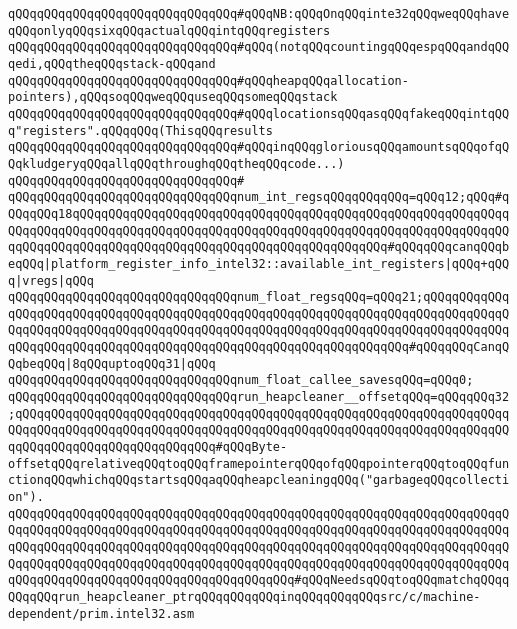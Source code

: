 \verb|qQQqqQQqqQQqqQQqqQQqqQQqqQQqqQQq#qQQqNB:qQQqOnqQQqinte32qQQqweqQQqhaveqQQqonlyqQQqsixqQQqactualqQQqintqQQqregisters|\newline
\verb|qQQqqQQqqQQqqQQqqQQqqQQqqQQqqQQq#qQQq(notqQQqcountingqQQqespqQQqandqQQqedi,qQQqtheqQQqstack-qQQqand|\newline
\verb|qQQqqQQqqQQqqQQqqQQqqQQqqQQqqQQq#qQQqheapqQQqallocation-pointers),qQQqsoqQQqweqQQquseqQQqsomeqQQqstack|\newline
\verb|qQQqqQQqqQQqqQQqqQQqqQQqqQQqqQQq#qQQqlocationsqQQqasqQQqfakeqQQqintqQQq"registers".qQQqqQQq(ThisqQQqresults|\newline
\verb|qQQqqQQqqQQqqQQqqQQqqQQqqQQqqQQq#qQQqinqQQqgloriousqQQqamountsqQQqofqQQqkludgeryqQQqallqQQqthroughqQQqtheqQQqcode...)|\newline
\verb|qQQqqQQqqQQqqQQqqQQqqQQqqQQqqQQq#|\newline
\verb|qQQqqQQqqQQqqQQqqQQqqQQqqQQqqQQqnum_int_regsqQQqqQQqqQQq=qQQq12;qQQq#qQQqqQQq18qQQqqQQqqQQqqQQqqQQqqQQqqQQqqQQqqQQqqQQqqQQqqQQqqQQqqQQqqQQqqQQqqQQqqQQqqQQqqQQqqQQqqQQqqQQqqQQqqQQqqQQqqQQqqQQqqQQqqQQqqQQqqQQqqQQqqQQqqQQqqQQqqQQqqQQqqQQqqQQqqQQqqQQqqQQqqQQqqQQqqQQq#qQQqqQQqcanqQQqbeqQQq|\verb#|platform_register_info_intel32::available_int_registers|qQQq+qQQq|vregs|qQQq#\newline
\verb|qQQqqQQqqQQqqQQqqQQqqQQqqQQqqQQqnum_float_regsqQQq=qQQq21;qQQqqQQqqQQqqQQqqQQqqQQqqQQqqQQqqQQqqQQqqQQqqQQqqQQqqQQqqQQqqQQqqQQqqQQqqQQqqQQqqQQqqQQqqQQqqQQqqQQqqQQqqQQqqQQqqQQqqQQqqQQqqQQqqQQqqQQqqQQqqQQqqQQqqQQqqQQqqQQqqQQqqQQqqQQqqQQqqQQqqQQqqQQqqQQqqQQqqQQqqQQqqQQq#qQQqqQQqCanqQQqbeqQQq|\verb#|8qQQquptoqQQq31|qQQq#\newline
\newline
\verb|qQQqqQQqqQQqqQQqqQQqqQQqqQQqqQQqnum_float_callee_savesqQQq=qQQq0;|\newline
\newline
\verb|qQQqqQQqqQQqqQQqqQQqqQQqqQQqqQQqrun_heapcleaner__offsetqQQq=qQQqqQQq32;qQQqqQQqqQQqqQQqqQQqqQQqqQQqqQQqqQQqqQQqqQQqqQQqqQQqqQQqqQQqqQQqqQQqqQQqqQQqqQQqqQQqqQQqqQQqqQQqqQQqqQQqqQQqqQQqqQQqqQQqqQQqqQQqqQQqqQQqqQQqqQQqqQQqqQQqqQQqqQQqqQQqqQQq#qQQqByte-offsetqQQqrelativeqQQqtoqQQqframepointerqQQqofqQQqpointerqQQqtoqQQqfunctionqQQqwhichqQQqstartsqQQqaqQQqheapcleaningqQQq("garbageqQQqcollection").|\newline
\verb|qQQqqQQqqQQqqQQqqQQqqQQqqQQqqQQqqQQqqQQqqQQqqQQqqQQqqQQqqQQqqQQqqQQqqQQqqQQqqQQqqQQqqQQqqQQqqQQqqQQqqQQqqQQqqQQqqQQqqQQqqQQqqQQqqQQqqQQqqQQqqQQqqQQqqQQqqQQqqQQqqQQqqQQqqQQqqQQqqQQqqQQqqQQqqQQqqQQqqQQqqQQqqQQqqQQqqQQqqQQqqQQqqQQqqQQqqQQqqQQqqQQqqQQqqQQqqQQqqQQqqQQqqQQqqQQqqQQqqQQqqQQqqQQqqQQqqQQqqQQqqQQqqQQqqQQqqQQqqQQq#qQQqNeedsqQQqtoqQQqmatchqQQqqQQqqQQqrun_heapcleaner_ptrqQQqqQQqqQQqinqQQqqQQqqQQqsrc/c/machine-dependent/prim.intel32.asm|\newline
